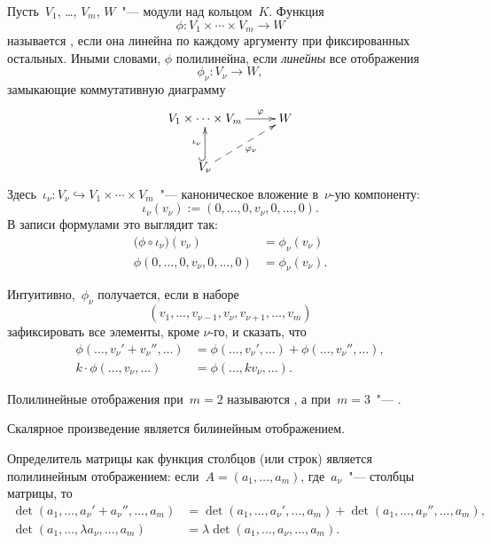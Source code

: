 \begin{definition}
	Пусть~$V_1$, \dots, $V_m$, $W$~"--- модули над кольцом~$K$. Функция
	\[
		\phi \colon V_1 \times \cdots \times V_m \to W
	\]
	называется , если она линейна по каждому аргументу при фиксированных остальных. Иными словами, $\phi$ полилинейна, если \emph{линейны} все отображения
	\[
		\phi_\nu \colon V_\nu \to W,
	\]
	замыкающие коммутативную диаграмму
	\[
		\xymatrix{
			V_1 \times \cdots \times V_m
			\ar [r] ^-{\phi}
			&
			W
			\\
			V_\nu
			\mathstrut
			\ar @{-->} [ur] _-{\phi_\nu}
			\ar @{^(->} [u] ^-{\iota_\nu}
		}
	\]
	Здесь~$\iota_\nu \colon V_\nu \hookrightarrow V_1 \times \cdots \times V_m$~"--- каноническое вложение в~$\nu$-ую компоненту:
	\[
		\iota_\nu(v_\nu) := (0, \dots, 0, v_\nu, 0, \dots, 0)
		.
	\]
	В записи формулами это выглядит так:
	\begin{align*}
		\bigl(
			\phi \circ \iota_\nu 
		\bigr)
		(v_\nu)
		&=
		\phi_\nu (v_\nu)
		\\
		\phi
		(0, \dots, 0, v_\nu, 0, \dots, 0)
		&=
		\phi_\nu (v_\nu)
		.
	\end{align*}
\end{definition}
Интуитивно,~$\phi_\nu$ получается, если в наборе
\[
	(v_1, \dots, v_{\nu-1}, v_\nu, v_{\nu+1}, \dots, v_m)
\]
зафиксировать все элементы, кроме $\nu$-го, и сказать, что
\begin{align*}
	\phi(\dots, v_\nu' + v_\nu'', \dots) &=
	\phi(\dots, v_\nu', \dots) +
	\phi(\dots, v_\nu'', \dots)
	,
	\\
	k \cdot \phi(\dots, v_\nu, \dots) &=
	\phi(\dots, kv_\nu, \dots)
	.
\end{align*}

% 

\begin{definition}
	Полилинейные отображения при~$m = 2$ называются , а при~$m = 3$~"--- .
\end{definition}

\begin{example}
	Скалярное произведение является билинейным отображением.
\end{example}
\begin{example}
	Определитель матрицы как функция столбцов (или строк) является полилинейным отображением: если~$A = (a_1, \dots, a_m)$, где~$a_\nu$~"--- столбцы матрицы, то
	\begin{align*}
		\det(a_1, \dots, a_\nu' + a_\nu'', \dots, a_m)
		&=
		\det(a_1, \dots, a_\nu', \dots, a_m) +
		\det(a_1, \dots, a_\nu'', \dots, a_m),
		\\
		\det(a_1, \dots, \lambda a_\nu, \dots, a_m)
		&=
		\lambda \det(a_1, \dots, a_\nu, \dots, a_m)
		.
	\end{align*}
\end{example}

